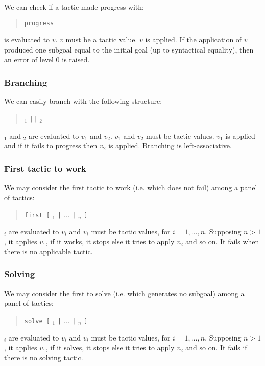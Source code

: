 We can check if a tactic made progress with:
\begin{quote}
{\tt progress} {\tacexpr}
\end{quote}
{\tacexpr} is evaluated to $v$. $v$ must be a tactic value. $v$ is
applied. If the application of $v$ produced one subgoal equal to the
initial goal (up to syntactical equality), then an error of level 0 is
raised. 

\ErrMsg {}

\subsubsection[Branching]{Branching\tacindex{$\mid\mid$}
}

We can easily branch with the following structure:
\begin{quote}
{\tacexpr}$_1$ {\tt ||} {\tacexpr}$_2$
\end{quote}
{\tacexpr}$_1$ and {\tacexpr}$_2$ are evaluated to $v_1$ and
$v_2$. $v_1$ and $v_2$ must be tactic values. $v_1$ is applied and if
it fails to progress then $v_2$ is applied. Branching is left-associative.

\subsubsection[First tactic to work]{First tactic to work
}

We may consider the first tactic to work (i.e. which does not fail) among a
panel of tactics:
\begin{quote}
{\tt first [} {\tacexpr}$_1$ {\tt |} $...$ {\tt |} {\tacexpr}$_n$ {\tt ]}
\end{quote}
{\tacexpr}$_i$ are evaluated to $v_i$ and $v_i$ must be tactic values, for 
$i=1,...,n$. Supposing $n>1$, it applies $v_1$, if it works, it stops else it
tries to apply $v_2$ and so on. It fails when there is no applicable tactic.

\ErrMsg {}

\subsubsection[Solving]{Solving
}

We may consider the first to solve (i.e. which generates no subgoal) among a
panel of tactics:
\begin{quote}
{\tt solve [} {\tacexpr}$_1$ {\tt |} $...$ {\tt |} {\tacexpr}$_n$ {\tt ]}
\end{quote}
{\tacexpr}$_i$ are evaluated to $v_i$ and $v_i$ must be tactic values, for 
$i=1,...,n$. Supposing $n>1$, it applies $v_1$, if it solves, it stops else it
tries to apply $v_2$ and so on. It fails if there is no solving tactic.

